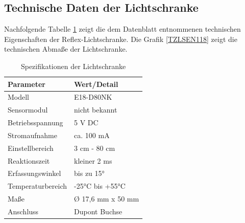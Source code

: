 	\subsection{Technische Daten der Lichtschranke } 
	Nachfolgende Tabelle \ref{TabelleSpezifikationLS} 
	zeigt die dem Datenblatt \cite{Roboter-Bausatz:2026} entnommenen technischen Eigenschaften der Reflex-Lichtschranke.
	Die Grafik  \ref{TZLSEN118} zeigt die technischen Abmaße der Lichtschranke.  
\begin{table}[h!]
	\caption{Spezifikationen der Lichtschranke \cite{Roboter-Bausatz:2026}}
	\begin{center}
		\begin{tabular}{|l|l|}
			\hline
			\textbf{Parameter} &\textbf{Wert/Detail}\\
			\hline
			Modell &  E18-D80NK\\
			\hline
			Sensormodul & nicht bekannt \\
			\hline 
			Betriebsspannung & 5 V DC\\
			\hline
			Stromaufnahme & ca. 100 mA\\
			\hline
			Einstellbereich & 3 cm - 80 cm\\
			\hline
			Reaktionszeit & kleiner 2 ms\\
			\hline
			Erfassungswinkel & bis zu 15°\\
			\hline
			Temperaturbereich & -25°C bis +55°C\\
			\hline
			Maße & Ø 17,6 mm x 50 mm\\
			\hline
			Anschluss & Dupont Buchse\\ 
			\hline
		\end{tabular}
	\label{TabelleSpezifikationLS}
	\end{center}
\end{table} 




